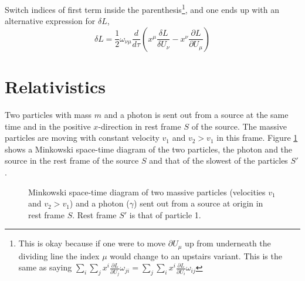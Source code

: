 \documentclass[11pt]{amsart}
\begin{document}
Switch indices of first term inside the parenthesis\footnote{This is okay because if one were to move $\partial U_\mu$ up from underneath the dividing line the index $\mu$ would change to an upstairs variant. This is the same as saying $\sum_i \sum_j x^i\frac{\partial L}{\partial U_j}\omega_{ji} = \sum_j \sum_i x^i\frac{\partial L}{\partial U_i}\omega_{ij}$}, and one ends up with an alternative expression for $\delta L$,
\begin{equation}
\delta L = \frac{1}{2}\omega_{\nu\mu} \frac{d}{d\tau}\left(x^\mu\frac{\delta L}{\delta U_\nu} - x^\nu\frac{\partial L}{\partial U_\mu} \right)
\end{equation}

\section{Relativistics}
Two particles with mass $m$ and a photon is sent out from a source at the same time and in the positive $x$-direction in rest frame $S$ of the source. The massive particles are moving with constant velocity $v_1$ and $v_2>v_1$ in this frame. Figure \ref{fig:minkowski1} shows a Minkowski space-time diagram of the two particles, the photon and the source in the rest frame of the source $S$ and that of the slowest of the particles $S'$. 

\begin{figure}
\centering
{}
\caption{Minkowski space-time diagram of two massive particles (velocities $v_1$ and $v_2>v_1$) and a photon ($\gamma$) sent out from a source at origin in rest frame $S$. Rest frame $S'$ is that of particle 1.}
\label{fig:minkowski1}
\end{figure}
\end{document}
